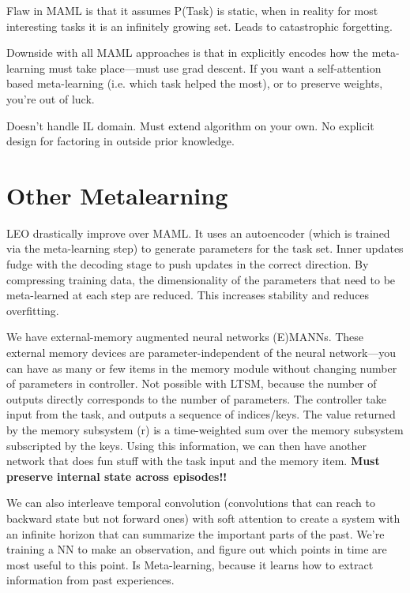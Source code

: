 \documentclass[american]{IEEEtran}   	%
\begin{document}
Flaw in MAML is that it assumes P(Task) is static, when in reality for most interesting tasks it is an infinitely growing set.
Leads to catastrophic forgetting\cite{Wang_2020}.

Downside with all MAML approaches is that in explicitly encodes how the meta-learning must take place---must use grad descent.
If you want a self-attention based meta-learning (i.e. which task helped the most)\cite{mishra2017simple}, or to preserve weights\cite{Kirkpatrick_2017}, you're out of luck.

Doesn't handle IL domain\cite{duan2017oneshot}.
Must extend algorithm on your own.
No explicit design for factoring in outside prior knowledge.






\section{Other Metalearning}
LEO drastically improve over MAML\cite{rusu2018metalearning}.
It uses an autoencoder (which is trained via the meta-learning step) to generate parameters for the task set.
Inner updates fudge with the decoding stage to push updates in the correct direction.
By compressing training data, the dimensionality of the parameters that need to be meta-learned at each step are reduced.
This increases stability and reduces overfitting.

We have external-memory augmented neural networks (E)MANNs.
These external memory devices are parameter-independent of the neural network---you can have as many or few items in the memory module without changing number of parameters in controller\cite{pmlr-v48-santoro16}.
Not possible with LTSM, because the number of outputs directly corresponds to the number of parameters.
The controller take input from the task, and outputs a sequence of indices/keys.
The value returned by the memory subsystem (r) is a time-weighted sum over the memory subsystem subscripted by the keys.
Using this information, we can then have another network that does fun stuff with the task input and the memory item.
\textbf{Must preserve internal state across episodes!!\cite{mishra2017simple}}

We can also interleave temporal convolution (convolutions that can reach to backward state but not forward ones) with soft attention to create a system with an infinite horizon that can summarize the important parts of the past\cite{mishra2017simple}.
We're training a NN to make an observation, and figure out which points in time are most useful to this point.
Is Meta-learning, because it learns how to extract information from past experiences.
\end{document}
